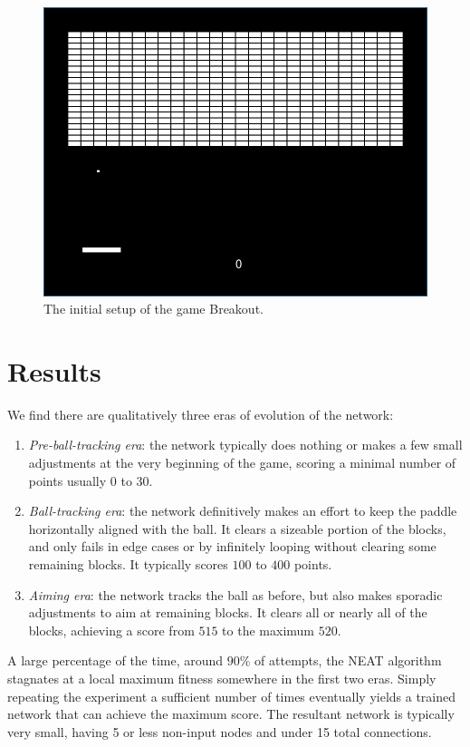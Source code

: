 \documentclass[letterpaper, twocolumn, conference]{article}
\begin{document}
\begin{figure}[h!]
    \centering
    \includegraphics[width=.45\textwidth]{breakout.png}
    \caption{The initial setup of the game Breakout.}
\end{figure}

\section{Results}
We find there are qualitatively three eras of evolution of the network:
\begin{enumerate}
    \item{}\emph{Pre-ball-tracking era}: the network typically does nothing or makes a few small adjustments at the very beginning of the game, scoring a minimal number of points usually $0$ to $30$.
    \item{}\emph{Ball-tracking era}: the network definitively makes an effort to keep the paddle horizontally aligned with the ball. It clears a sizeable portion of the blocks, and only fails in edge cases or by infinitely looping without clearing some remaining blocks. It typically scores $100$ to $400$ points.
    \item{}\emph{Aiming era}: the network tracks the ball as before, but also makes sporadic adjustments to aim at remaining blocks. It clears all or nearly all of the blocks, achieving a score from $515$ to the maximum $520$.
\end{enumerate}
A large percentage of the time, around $90\%$ of attempts, the NEAT algorithm stagnates at a local maximum
fitness somewhere in the first two eras.
Simply repeating the experiment a sufficient number of times eventually yields a trained network that
can achieve the maximum score.
The resultant network is typically very small, having 5 or less non-input nodes and under 15 total connections.
\end{document}
